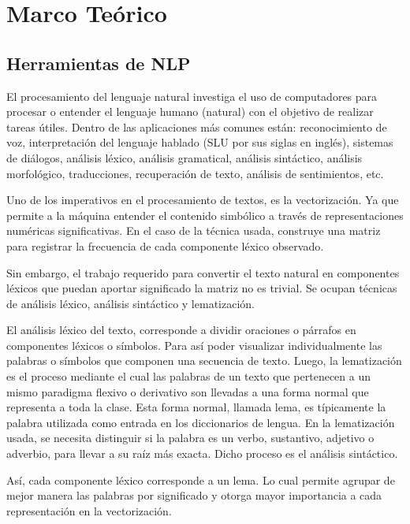 \section{Marco Teórico}
{
\subsection{Herramientas de NLP}
El procesamiento del lenguaje natural investiga el uso de computadores para procesar o entender el lenguaje humano (natural) con el objetivo de realizar tareas útiles. Dentro de las aplicaciones más comunes están: reconocimiento de voz, interpretación del lenguaje hablado (SLU por sus siglas en inglés), sistemas de diálogos, análisis léxico, análisis gramatical, análisis sintáctico, análisis morfológico, traducciones, recuperación de texto, análisis de sentimientos, etc. 

Uno de los imperativos en el procesamiento de textos, es la vectorización. Ya que permite a la máquina entender el contenido simbólico a través de representaciones numéricas significativas. En el caso de la técnica usada, construye una matriz para registrar la frecuencia de cada componente léxico observado. 

Sin embargo, el trabajo requerido para convertir el texto natural en componentes léxicos que puedan aportar significado  la matriz no es trivial. Se ocupan técnicas de análisis léxico, análisis sintáctico y lematización. 

El análisis léxico del texto, corresponde a dividir oraciones o párrafos en componentes léxicos o símbolos. Para así poder visualizar individualmente las palabras o símbolos que componen una secuencia de texto. Luego, la lematización es el proceso mediante el cual las palabras de un texto que pertenecen a un mismo paradigma flexivo o derivativo son llevadas a una forma normal que representa a toda la clase. Esta forma normal, llamada lema, es típicamente la palabra utilizada como entrada en los diccionarios de lengua. En la lematización usada, se necesita distinguir si la palabra es un verbo, sustantivo, adjetivo o adverbio, para llevar a su raíz más exacta. Dicho proceso es el análisis sintáctico. 

Así, cada componente léxico corresponde a un lema. Lo cual permite agrupar de mejor manera las palabras por significado y otorga mayor importancia a cada representación en la vectorización. 

}

